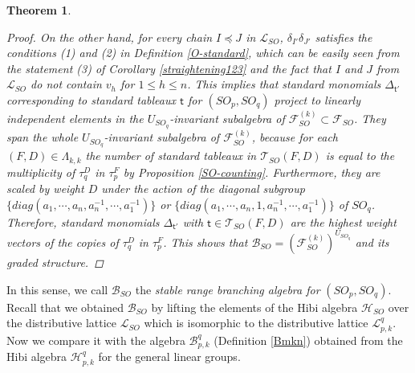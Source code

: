\documentclass[11pt]{amsart}
\numberwithin{equation}{subsection}
\newtheorem{theorem}{Theorem}[subsection]
\begin{document}
\begin{theorem}
\begin{proof}
On the other hand, for every chain $I \preceq J$ in $\mathcal{L}_{SO}$, $\delta_{I'} \delta_{J'}$
satisfies the conditions (1) and (2) in Definition \ref{O-standard}, which can be easily seen 
from the statement (3) of Corollary \ref{straightening123} and the fact that $I$ and $J$ from
$\mathcal{L}_{SO}$ do not contain $v_h$ for $1 \leq h \leq n$. This implies that standard monomials
${\Delta}_{\mathsf{t}'}$ corresponding to standard tableaux $\mathsf{t}$ for $({SO}_{p},{SO}_{q})$
project to linearly independent elements in the $U_{SO_{q}}$-invariant subalgebra of
$\mathcal{F}_{{SO}}^{(k)}  \subset \mathcal{F}_{{SO}}$. They span the whole 
$U_{SO_{q}}$-invariant subalgebra of 
$\mathcal{F}_{{SO}}^{(k)}$, because for each $(F,D)\in \Lambda _{k,k}$ the number 
of standard tableaux in $\mathcal{T}_{SO}(F,D)$ is equal to the
multiplicity of $\tau _{q}^{D}$ in $\tau _{p}^{F}$ by 
Proposition \ref{SO-counting}. Furthermore, they are scaled by weight $D$ under 
the action of the diagonal subgroup 
$\{diag(a_{1},\cdots ,a_{n},a_{n}^{-1},\cdots ,a_{1}^{-1})\}$ or 
$\{diag(a_{1},\cdots ,a_{n}, 1 , a_{n}^{-1},\cdots ,a_{1}^{-1})\}$ of ${SO}_{q}$.
Therefore, standard monomials $\Delta_{\mathsf{t}'}$ with 
$\mathsf{t}\in \mathcal{T}_{SO}(F,D)$ are the highest weight vectors of the
copies of $\tau _{q}^{D}$ in $\tau _{p}^{F}$. This shows that
$\mathcal{B}_{SO} = \left( \mathcal{F}_{{SO}}^{(k)}\right) ^{U_{{SO}_{q}}}$
and its graded structure.
\end{proof}
\end{theorem}


In this sense, we call $\mathcal{B}_{SO}$ the \textit{stable range branching algebra for} 
$({SO}_{p}, {SO}_{q})$. Recall that we obtained $\mathcal{B}_{SO}$ by lifting 
the elements of the Hibi algebra $\mathcal{H}_{SO}$ over the distributive lattice 
$\mathcal{L}_{SO}$ which is isomorphic to the distributive lattice 
$\mathcal{L}_{p,k}^{q}$. Now we compare it with the algebra 
$\mathcal{B}_{p,k}^{q}$ (Definition \ref{Bmkn}) obtained from the Hibi algebra 
$\mathcal{H}_{p,k}^{q}$ for the general linear groups.
\end{document}
